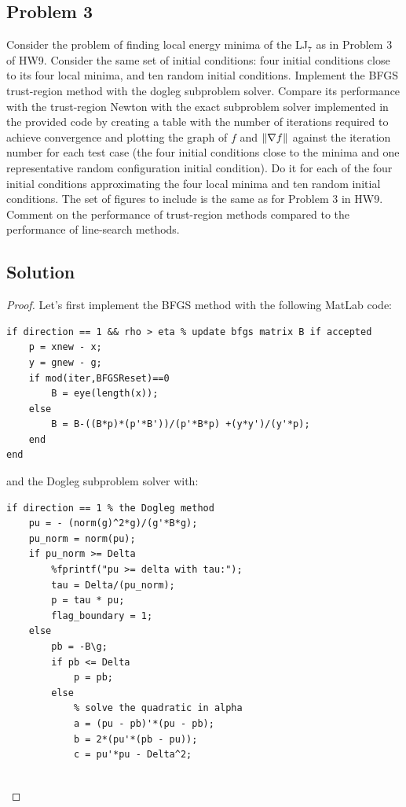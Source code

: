 \documentclass[12pt]{report}
\begin{document}
\begin{problem}%
\subsection*{Problem 3}

Consider the problem of finding local energy minima of the LJ$_7$ as in Problem 3 of HW9. Consider the same set of initial conditions: four initial conditions close to its four local minima, and ten random initial conditions. Implement the BFGS trust-region method with the dogleg subproblem solver. Compare its performance with the trust-region Newton with the exact subproblem solver implemented in the provided code by creating a table with the number of iterations required to achieve convergence and plotting the graph of $f$ and ${\left\|\nabla f\right\|}$ against the iteration number for each test case (the four initial conditions close to the minima and one representative random configuration initial condition). Do it for each of the four initial conditions approximating the four local minima and ten random initial conditions. The set of figures to include is the same as for Problem 3 in HW9. Comment on the performance of trust-region methods compared to the performance of line-search methods.

\subsection*{Solution}
\begin{proof}

Let's first implement the BFGS method with the following MatLab code:
\begin{lstlisting}[style=Matlab-editor]
if direction == 1 && rho > eta % update bfgs matrix B if accepted
    p = xnew - x;
    y = gnew - g;
    if mod(iter,BFGSReset)==0
        B = eye(length(x));
    else
        B = B-((B*p)*(p'*B'))/(p'*B*p) +(y*y')/(y'*p);
    end
end
\end{lstlisting}
and the Dogleg subproblem solver with:
\begin{lstlisting}[style=Matlab-editor]
if direction == 1 % the Dogleg method
    pu = - (norm(g)^2*g)/(g'*B*g);
    pu_norm = norm(pu);
    if pu_norm >= Delta
        %fprintf("pu >= delta with tau:");
        tau = Delta/(pu_norm);
        p = tau * pu;
        flag_boundary = 1;
    else 
        pb = -B\g;
        if pb <= Delta
            p = pb;
        else
            % solve the quadratic in alpha
            a = (pu - pb)'*(pu - pb);
            b = 2*(pu'*(pb - pu));
            c = pu'*pu - Delta^2;
            

\end{lstlisting}
\end{proof}
\end{problem}
\end{document}
